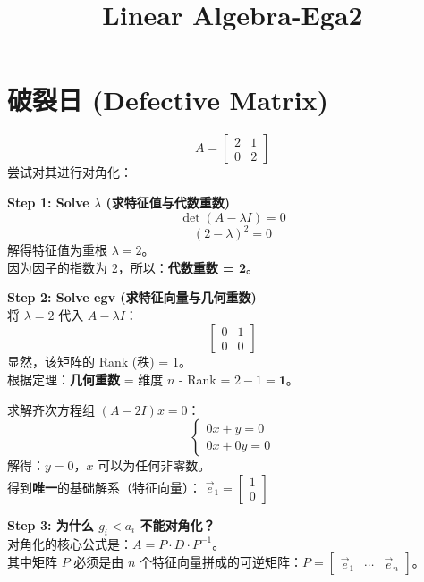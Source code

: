 \documentclass[12pt]{article}
\title{Linear Algebra-Ega2}
\date{}
\begin{document}
\maketitle


\section{破裂日 (Defective Matrix)}
\begin{flushleft}
    \[ A = \begin{bmatrix}
            2 & 1 \\
            0 & 2
        \end{bmatrix} \]
    尝试对其进行对角化：

    \vspace{0.5em}
    \noindent\textbf{Step 1: Solve $\lambda$ (求特征值与代数重数)} \\
    \[
        \det(A - \lambda I) = 0
    \]
    \[
        (2-\lambda)^{2}  = 0
    \]
    解得特征值为重根 $\lambda = 2$。\\
    因为因子的指数为 2，所以：\textbf{代数重数 = 2}。

    \vspace{0.5em}
    \noindent\textbf{Step 2: Solve egv (求特征向量与几何重数)} \\
    将 $\lambda = 2$ 代入 $A - \lambda I$：
    \[
        \begin{bmatrix}
            0 & 1 \\
            0 & 0
        \end{bmatrix}
    \]
    显然，该矩阵的 Rank (秩) = 1。\\
    根据定理：\textbf{几何重数} = 维度 $n$ - Rank = $2 - 1 = \textbf{1}$。

    求解齐次方程组 $(A - 2I)x = 0$：
    \[ \begin{cases}
            0x  +  y = 0 \\
            0x  +  0y = 0
        \end{cases} \]
    解得：$y = 0$，$x$ 可以为任何非零数。\\
    得到\textbf{唯一}的基础解系（特征向量）：
    $\vec{e}_1 =  \begin{bmatrix} 1 \\ 0 \end{bmatrix}$

    \vspace{0.5em}
    \noindent\textbf{Step 3: 为什么 $g_{i} < a_{i}$ 不能对角化？} \\
    对角化的核心公式是：$A = P \cdot D \cdot P^{-1}$。\\
    其中矩阵 $P$ 必须是由 $n$ 个特征向量拼成的可逆矩阵：$P = \begin{bmatrix} \vec{e}_1 & \cdots & \vec{e}_n \end{bmatrix}$。


\end{flushleft}
\end{document}
